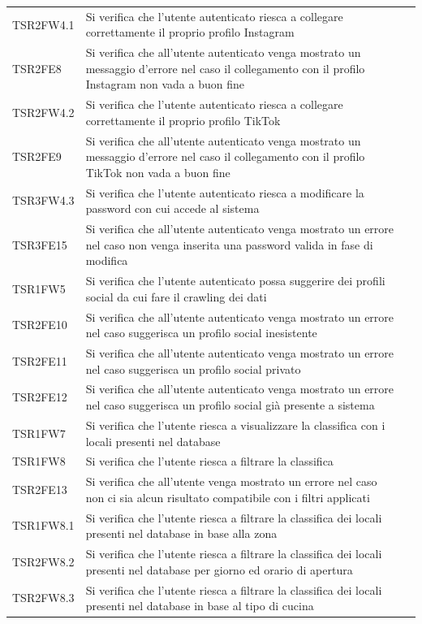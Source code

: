 \begin{longtable}{ m{}<{\centering}  m{}<{\centering}  m{}<{\centering} }
	TSR2FW4.1 & Si verifica che l'utente autenticato riesca a collegare correttamente il proprio profilo Instagram & \Ni \\
	TSR2FE8 & Si verifica che all'utente autenticato venga mostrato un messaggio d'errore nel caso il collegamento con il profilo Instagram non vada a buon fine & \Ni \\
	TSR2FW4.2 & Si verifica che l'utente autenticato riesca a collegare correttamente il proprio profilo TikTok & \Ni \\
	TSR2FE9 & Si verifica che all'utente autenticato venga mostrato un messaggio d'errore nel caso il collegamento con il profilo TikTok non vada a buon fine & \Ni \\
	TSR3FW4.3 & Si verifica che l'utente autenticato riesca a modificare la password con cui accede al sistema & \Ni \\
	TSR3FE15 & Si verifica che all'utente autenticato venga mostrato un errore nel caso non venga inserita una password valida in fase di modifica & \Ni \\
	TSR1FW5 & Si verifica che l'utente autenticato possa suggerire dei profili social da cui fare il crawling dei dati & \Ni \\
	TSR2FE10 & Si verifica che all'utente autenticato venga mostrato un errore nel caso suggerisca un profilo social inesistente & \Ni \\
	TSR2FE11 & Si verifica che all'utente autenticato venga mostrato un errore nel caso suggerisca un profilo social privato & \Ni \\
	TSR2FE12 & Si verifica che all'utente autenticato venga mostrato un errore nel caso suggerisca un profilo social già  presente a sistema & \Ni \\
	TSR1FW7 & Si verifica che l'utente riesca a visualizzare la classifica con i locali presenti nel database & \Ni \\
	TSR1FW8 & Si verifica che l'utente riesca a filtrare la classifica & \Ni \\
	TSR2FE13 & Si verifica che all'utente venga mostrato un errore nel caso non ci sia alcun risultato compatibile con i filtri applicati & \Ni \\
	TSR1FW8.1 & Si verifica che l'utente riesca a filtrare la classifica dei locali presenti nel database in base alla zona & \Ni \\
	TSR2FW8.2 & Si verifica che l'utente riesca a filtrare la classifica dei locali presenti nel database per giorno ed orario di apertura & \Ni \\
	TSR2FW8.3 & Si verifica che l'utente riesca a filtrare la classifica dei locali presenti nel database in base al tipo di cucina & \Ni \\

\end{longtable}

